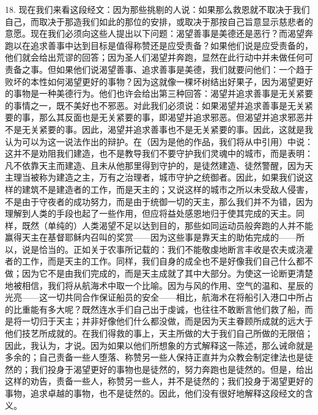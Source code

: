 18. 现在我们来看这段经文：因为那些挑剔的人说：如果那么救恩就不取决于我们自己，而取决于那造我们如此的那位的安排，或取决于那按自己旨意显示慈悲者的意愿。现在我们必须向这些人提出以下问题：渴望善事是美德还是恶行？而渴望奔跑以在追求善事中达到目标是值得称赞还是应受责备？如果他们说是应受责备的，他们就会给出荒谬的回答；因为圣人们渴望并奔跑，显然在此行动中并未做任何可责备之事。但如果他们说渴望善事、追求善事是美德，我们就要问他们：一个趋于败坏的本性如何渴望更好的事物？因为这就像一棵坏树结出好果子，因为渴望更好的事物是一种美德行为。他们也许会给出第三种回答：渴望并追求善事是无关紧要的事情之一，既不美好也不邪恶。对此我们必须说：如果渴望并追求善事是无关紧要的事，那么其反面也是无关紧要的事，即渴望并追求邪恶。但渴望并追求邪恶并不是无关紧要的事。因此，渴望并追求善事也不是无关紧要的事。因此，这就是我认为可以为这一说法作出的辩护。在（因为是他的作品，我们将从中引用）中说：这并不是劝阻我们建造，也不是教导我们不要守护我们灵魂中的城市，而是表明：凡不依靠天主而建造、且未从他那里得到守护的，是徒然建造、徒然警醒，因为天主理当被称为建造之主，万有之治理者，城市守护之统御者。因此，如果我们说这样的建筑不是建造者的工作，而是天主的；又说这样的城市之所以未受敌人侵害，不是由于守夜者的成功努力，而是由于统御一切的天主，那么我们并不为错，因为理解到人类的手段也起了一些作用，但应将益处感恩地归于使其完成的天主。同样，既然（单纯的）人类渴望不足以达到目的，那些如同运动员般奔跑的人并不能赢得天主在基督耶稣内召叫的奖赏——因为这些事是靠天主的助佑完成的——所以，说是恰当的。正如关于农事所记载的：我们不能敬虔地断言丰收是农夫或浇灌者的工作，而是天主的工作。同样，我们自身的成全也不是好像我们自己什么都不做；因为它不是由我们完成的，而是天主成就了其中大部分。为使这一论断更清楚地被相信，我们将从航海术中取一个比喻。因为与风的作用、空气的温和、星辰的光亮——这一切共同合作保证船员的安全——相比，航海术在将船引入港口中所占的比重能有多大呢？既然连水手们自己出于虔诚，也往往不敢断言他们救了船，而是将一切归于天主；并非好像他们什么都没做，而是因为天主眷顾所成就的远大于他们技艺所成就的。在我们得救的事上，天主所做的大于我们自己所做的无限倍；因此，我认为，才说。因为如果以他们所想象的方式解释这一陈述，那么诫命就是多余的；自己责备一些人堕落、称赞另一些人保持正直并为众教会制定律法也是徒然的；我们投身于渴望更好的事物也是徒然的，努力奔跑也是徒然的。但是，给出这样的劝告，责备一些人，称赞另一些人，并不是徒然的；我们投身于渴望更好的事物，追求卓越的事物，也不是徒然的。因此，他们没有很好地解释这段经文的含义。\par


